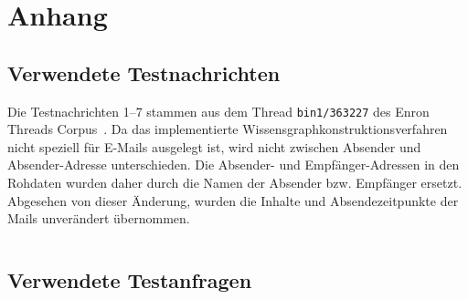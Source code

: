 
\chapter{Anhang}%
\label{sec:appendix}

\section{Verwendete Testnachrichten}%
\label{sec:appendix:testmsgs}

Die Testnachrichten 1--7 stammen aus dem Thread \texttt{bin1/363227} des Enron Threads Corpus~\cite{EnronThreads}.
Da das implementierte Wissensgraphkonstruktionsverfahren nicht speziell für E-Mails ausgelegt ist, wird nicht zwischen Absender und Absender-Adresse unterschieden.
Die Absender- und Empfänger-Adressen in den Rohdaten wurden daher durch die Namen der Absender bzw. Empfänger ersetzt.
Abgesehen von dieser Änderung, wurden die Inhalte und Absendezeitpunkte der Mails unverändert übernommen.
\inputminted{clojure}{data/evaluation/testdata.clj}

\section{Verwendete Testanfragen}%
\label{sec:appendix:testqueries}

\inputminted{cypher}{data/evaluation/people.cql}
\inputminted{cypher}{data/evaluation/personTimeAction.cql}
\inputminted{cypher}{data/evaluation/personNegationAction.cql}
